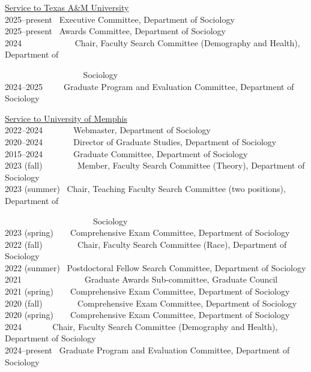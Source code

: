 \documentclass[11pt,]{article}
\begin{document}
\underline{Service to Texas A\&M University}\\
2025--present ~Executive Committee, Department of Sociology\\
2025--present ~Awards Committee, Department of Sociology\\
2024 ~ ~ ~ ~~ ~ ~ ~Chair, Faculty Search Committee (Demography and
Health), Department of\\
\strut ~ ~ ~ ~~ ~ ~ ~ ~ ~ ~ ~Sociology\\
2024--2025 ~ ~ ~Graduate Program and Evaluation Committee, Department of
Sociology

\underline{Service to University of Memphis}\\
2022--2024 ~ ~ ~ ~ Webmaster, Department of Sociology\\
2020--2024 ~ ~ ~ ~ Director of Graduate Studies, Department of
Sociology\\
2015--2024 ~ ~ ~ ~ Graduate Committee, Department of Sociology\\
2023 (fall) ~ ~ ~ ~ ~Member, Faculty Search Committee (Theory),
Department of Sociology\\
2023 (summer) ~Chair, Teaching Faculty Search Committee (two positions),
Department of\\
\strut ~ ~ ~ ~ ~ ~ ~ ~ ~ ~ ~ ~ ~Sociology\\
2023 (spring) ~ ~ Comprehensive Exam Committee, Department of
Sociology\\
2022 (fall) ~ ~ ~ ~ ~Chair, Faculty Search Committee (Race), Department
of Sociology\\
2022 (summer) ~Postdoctoral Fellow Search Committee, Department of
Sociology\\
2021 ~ ~ ~ ~ ~ ~ ~ ~ ~Graduate Awards Sub-committee, Graduate Council\\
2021 (spring) ~ ~ Comprehensive Exam Committee, Department of
Sociology\\
2020 (fall) ~ ~ ~ ~ ~Comprehensive Exam Committee, Department of
Sociology\\
2020 (spring) ~ ~ Comprehensive Exam Committee, Department of
Sociology\\
2024 ~ ~ ~ ~ Chair, Faculty Search Committee (Demography and Health),
Department of Sociology\\
2024--present ~Graduate Program and Evaluation Committee, Department of
Sociology
\end{document}
